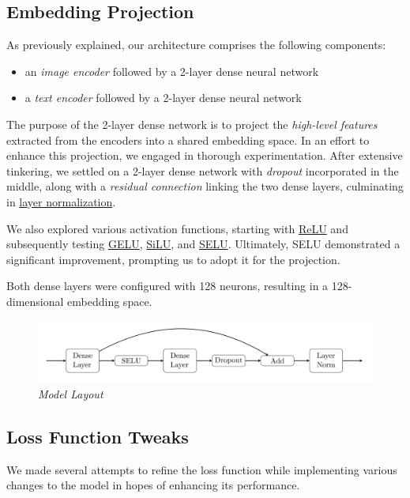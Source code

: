 \documentclass[10pt,twocolumn,letterpaper]{article}
\begin{document}
\subsection{Embedding Projection}
As previously explained, our architecture comprises the following components:
\begin{itemize}
   \item an \textit{image encoder} followed by a 2-layer dense neural network
   \item a \textit{text encoder} followed by a 2-layer dense neural network
\end{itemize}
The purpose of the 2-layer dense network is to project the \textit{high-level features} extracted from the encoders into a shared embedding space.
In an effort to enhance this projection, we engaged in thorough experimentation.
After extensive tinkering, we settled on a 2-layer dense network with \textit{dropout} incorporated in the middle, along with a \textit{residual connection} linking the two dense layers, culminating in \href{https://keras.io/api/layers/normalization_layers/layer_normalization/}{layer normalization}.

We also explored various activation functions, starting with \href{https://keras.io/api/layers/activation_layers/relu/}{ReLU} and subsequently testing \href{https://www.tensorflow.org/api_docs/python/tf/keras/activations/gelu}{GELU}, \href{https://www.tensorflow.org/api_docs/python/tf/nn/silu}{SiLU}, and \href{https://www.tensorflow.org/api_docs/python/tf/nn/selu}{SELU}. Ultimately, SELU demonstrated a significant improvement, prompting us to adopt it for the projection.

Both dense layers were configured with 128 neurons, resulting in a 128-dimensional embedding space.

\begin{figure}[H]
   \centering
   \includegraphics[width=1\linewidth]{img/Tikz_Model.png}
   \caption{\textit{Model Layout}}
\end{figure}  

\subsection{Loss Function Tweaks}
We made several attempts to refine the loss function while implementing various changes to the model in hopes of enhancing its performance.
\end{document}
